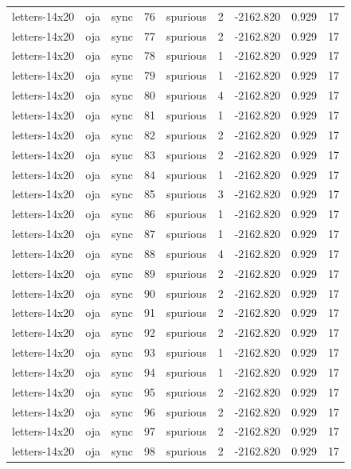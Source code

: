 \begin{tabular}{lllrlrrrr}
letters-14x20 & oja & sync & 76 & spurious & 2 & -2162.820 & 0.929 & 17 \\
letters-14x20 & oja & sync & 77 & spurious & 2 & -2162.820 & 0.929 & 17 \\
letters-14x20 & oja & sync & 78 & spurious & 1 & -2162.820 & 0.929 & 17 \\
letters-14x20 & oja & sync & 79 & spurious & 1 & -2162.820 & 0.929 & 17 \\
letters-14x20 & oja & sync & 80 & spurious & 4 & -2162.820 & 0.929 & 17 \\
letters-14x20 & oja & sync & 81 & spurious & 1 & -2162.820 & 0.929 & 17 \\
letters-14x20 & oja & sync & 82 & spurious & 2 & -2162.820 & 0.929 & 17 \\
letters-14x20 & oja & sync & 83 & spurious & 2 & -2162.820 & 0.929 & 17 \\
letters-14x20 & oja & sync & 84 & spurious & 1 & -2162.820 & 0.929 & 17 \\
letters-14x20 & oja & sync & 85 & spurious & 3 & -2162.820 & 0.929 & 17 \\
letters-14x20 & oja & sync & 86 & spurious & 1 & -2162.820 & 0.929 & 17 \\
letters-14x20 & oja & sync & 87 & spurious & 1 & -2162.820 & 0.929 & 17 \\
letters-14x20 & oja & sync & 88 & spurious & 4 & -2162.820 & 0.929 & 17 \\
letters-14x20 & oja & sync & 89 & spurious & 2 & -2162.820 & 0.929 & 17 \\
letters-14x20 & oja & sync & 90 & spurious & 2 & -2162.820 & 0.929 & 17 \\
letters-14x20 & oja & sync & 91 & spurious & 2 & -2162.820 & 0.929 & 17 \\
letters-14x20 & oja & sync & 92 & spurious & 2 & -2162.820 & 0.929 & 17 \\
letters-14x20 & oja & sync & 93 & spurious & 1 & -2162.820 & 0.929 & 17 \\
letters-14x20 & oja & sync & 94 & spurious & 1 & -2162.820 & 0.929 & 17 \\
letters-14x20 & oja & sync & 95 & spurious & 2 & -2162.820 & 0.929 & 17 \\
letters-14x20 & oja & sync & 96 & spurious & 2 & -2162.820 & 0.929 & 17 \\
letters-14x20 & oja & sync & 97 & spurious & 2 & -2162.820 & 0.929 & 17 \\
letters-14x20 & oja & sync & 98 & spurious & 2 & -2162.820 & 0.929 & 17 \\

\end{tabular}

